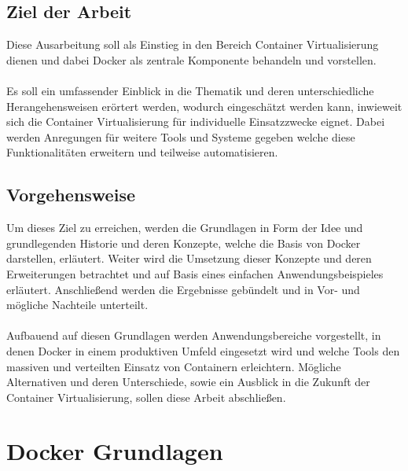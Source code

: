 \documentclass[12pt,toc=bib,toc=listof]{scrreprt}
\begin{document}

\section{Ziel der Arbeit} %
\label{sec:ziel_der_arbeit}

Diese Ausarbeitung soll als Einstieg in den Bereich Container Virtualisierung dienen und dabei Docker als zentrale Komponente behandeln und vorstellen.\\
\\
Es soll ein umfassender Einblick in die Thematik und deren unterschiedliche Herangehensweisen erörtert werden, wodurch eingeschätzt werden kann, inwieweit sich die Container Virtualisierung für individuelle Einsatzzwecke eignet.
Dabei werden Anregungen für weitere Tools und Systeme gegeben welche diese Funktionalitäten erweitern und teilweise automatisieren. 


\section{Vorgehensweise} %
\label{sec:vorgehensweise}

Um dieses Ziel zu erreichen, werden die Grundlagen in Form der Idee und grundlegenden Historie und deren Konzepte, welche die Basis von Docker darstellen, erläutert.
Weiter wird die Umsetzung dieser Konzepte und deren Erweiterungen betrachtet und auf Basis eines einfachen Anwendungsbeispieles erläutert.
Anschließend werden die Ergebnisse gebündelt und in Vor- und mögliche Nachteile unterteilt.\\
\\
Aufbauend auf diesen Grundlagen werden Anwendungsbereiche vorgestellt, in denen Docker in einem produktiven Umfeld eingesetzt wird und welche Tools den massiven und verteilten Einsatz von Containern erleichtern.
Mögliche Alternativen und deren Unterschiede, sowie ein Ausblick in die Zukunft der Container Virtualisierung, sollen diese Arbeit abschließen.




\chapter{Docker Grundlagen} %
\label{sec:grundlagen}
\end{document}
